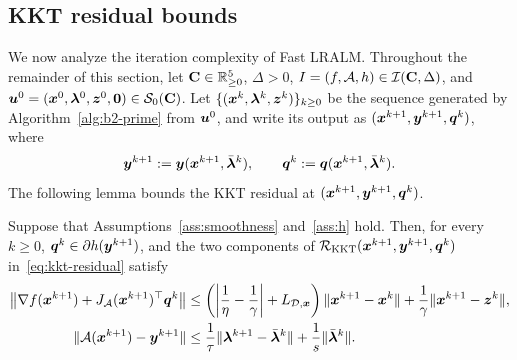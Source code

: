 \subsection{KKT residual bounds}
\label{subsec:fast-lralm-residual}
We now analyze the iteration complexity of Fast LRALM. Throughout the
remainder of this section, let \(\mathbf C\in\mathbb{R}^5_{\ge0}\), \(\Delta>0\),
\(I=(f,\mathcal{A},h)\in\mathcal I(\mathbf C,\Delta)\), and
\(\bm{u}^0=(\bm{x}^0,\bm{\lambda}^0,\bm{z}^0,\bm{0})\in\mathcal S_0(\mathbf C)\). Let
\(\{(\bm{x}^k,\bm{\lambda}^k,\bm{z}^k)\}_{k\ge0}\) be the sequence generated by
Algorithm~\ref{alg:b2-prime} from \(\bm{u}^0\), and write its output as
\((\bm{x}^{k+1},\bm{y}^{k+1},\bm{q}^k)\), where
\begin{equation}
    \bm{y}^{k+1}:=\bm{y}(\bm{x}^{k+1},\bar{\bm{\lambda}}^k),
    \qquad \bm{q}^k:=\bm{q}(\bm{x}^{k+1},\bar{\bm{\lambda}}^k).
    \label{eq:b2-prime-outputs}
\end{equation}
The following lemma bounds the KKT residual at \((\bm{x}^{k+1},\bm{y}^{k+1},\bm{q}^k)\).
\begin{lemma}
\label{lem:b2-prime-residual-decomposition}
Suppose that Assumptions~\ref{ass:smoothness} and~\ref{ass:h} hold. Then,
for every \(k\ge0\), \(\bm{q}^k\in\partial h(\bm{y}^{k+1})\), and the two components
of \(\mathcal R_{\mathrm{KKT}}(\bm{x}^{k+1},\bm{y}^{k+1},\bm{q}^k)\)
in~\eqref{eq:kkt-residual} satisfy
\[
\begin{aligned}
    \bigl\|\nabla f(\bm{x}^{k+1})+J_{\mathcal{A}}(\bm{x}^{k+1})^\top\bm{q}^k\bigr\|
    &\le\left(\left|\frac1\eta-\frac1\gamma\right|+L_{\mathcal{D},\bm{x}}\right)\|\bm{x}^{k+1}-\bm{x}^k\|
    +\frac1\gamma\|\bm{x}^{k+1}-\bm{z}^k\|,\\
    \|\mathcal{A}(\bm{x}^{k+1})-\bm{y}^{k+1}\|
    &\le\frac1\tau\|\bm{\lambda}^{k+1}-\bar{\bm{\lambda}}^k\|
    +\frac1s\|\bar{\bm{\lambda}}^k\|.
\end{aligned}
\]
\end{lemma}

